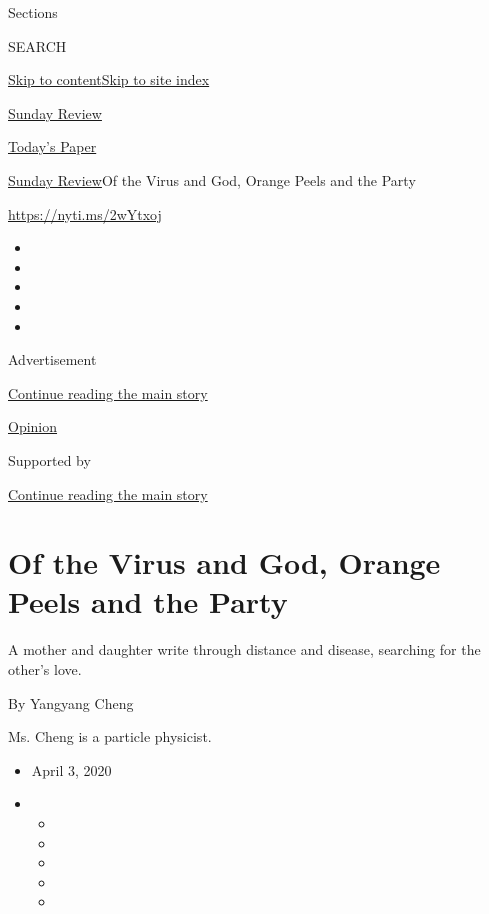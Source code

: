 Sections

SEARCH

\protect\hyperlink{site-content}{Skip to
content}\protect\hyperlink{site-index}{Skip to site index}

\href{https://www.nytimes3xbfgragh.onion/section/opinion/sunday}{Sunday
Review}

\href{https://myaccount.nytimes3xbfgragh.onion/auth/login?response_type=cookie\&client_id=vi}{}

\href{https://www.nytimes3xbfgragh.onion/section/todayspaper}{Today's
Paper}

\href{/section/opinion/sunday}{Sunday Review}\textbar{}Of the Virus and
God, Orange Peels and the Party

\url{https://nyti.ms/2wYtxoj}

\begin{itemize}
\item
\item
\item
\item
\item
\end{itemize}

Advertisement

\protect\hyperlink{after-top}{Continue reading the main story}

\href{/section/opinion}{Opinion}

Supported by

\protect\hyperlink{after-sponsor}{Continue reading the main story}

\hypertarget{of-the-virus-and-god-orange-peels-and-the-party}{%
\section{Of the Virus and God, Orange Peels and the
Party}\label{of-the-virus-and-god-orange-peels-and-the-party}}

A mother and daughter write through distance and disease, searching for
the other's love.

By Yangyang Cheng

Ms. Cheng is a particle physicist.

\begin{itemize}
\item
  April 3, 2020
\item
  \begin{itemize}
  \item
  \item
  \item
  \item
  \item
  \end{itemize}
\end{itemize}

